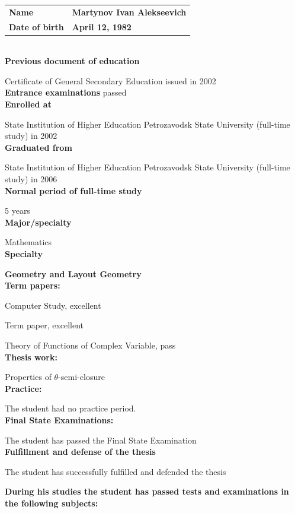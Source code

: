 \documentclass{article}
\begin{document}
\begin{tabular}{l l}
    \textbf{Name} & \textbf{Martynov Ivan Alekseevich}\\
    \textbf{Date of birth} & \textbf{April 12, 1982}
\end{tabular}
\medskip\\
\textbf{Previous document of education}\par
Certificate of General Secondary Education issued in 2002\\
\textbf{Entrance examinations}   passed\\
\textbf{Enrolled at}\par
State Institution of Higher Education Petrozavodsk State University (full-time study) in 2002\\
\textbf{Graduated from}\par
State Institution of Higher Education Petrozavodsk State University (full-time study) in 2006\\
\textbf{Normal period of full-time study}\par
5 years\\
\textbf{Major/specialty}\par
Mathematics\\
\textbf{Specialty}\par
\textbf{Geometry and Layout Geometry\\
Term papers:}\par
Computer Study, excellent\par
Term paper, excellent\par
Theory of Functions of Complex Variable, pass\\
{\bf Thesis work:}\par
Properties of $\theta$-semi-closure\\
\textbf{Practice:}\par
The student had no practice period.\\
\textbf{Final State Examinations:}\par
The student has passed the Final State Examination\\
\textbf{Fulfillment and defense of the thesis}\par
The student has successfully fulfilled and defended the thesis

\newpage

\textbf{During his studies the student has passed tests and examinations in the following subjects:}\\
\end{document}
